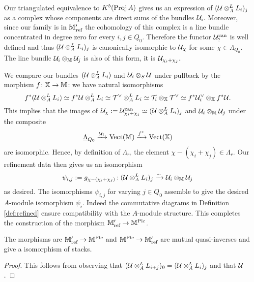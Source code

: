 \documentclass[12pt]{amsart}
\begin{document}
Our triangulated equivalence to $K^b(\operatorname{Proj} A)$ gives us an expression of $(\mathcal{U} \otimes_A^L L_i)_j$ as a complex whose components are direct sums of the bundles $\mathcal{U}_i$.
Moreover, since our family is in $\mathbb{M}_\text{ref}'$ the cohomology of this complex is a line bundle concentrated in degree zero for every $i,j \in Q_0$.
Therefore the functor $\mathcal{U}_?^\text{can}$ is well defined and thus $(\mathcal{U} \otimes_A^L L_i)_j$ is canonically isomorphic to $\mathcal{U}_{\chi}$ for some $\chi \in \Lambda_{Q_0}$.
The line bundle $\mathcal{U}_i \otimes_{\mathbb{M}} \mathcal{U}_j$ is also of this form, it is $\mathcal{U}_{\chi_i+\chi_j}$.

We compare our bundles $(\mathcal{U} \otimes_A^L L_i)$ and $\mathcal{U}_i \otimes_S \mathcal{U}$ under pullback by the morphism $f \colon \mathbb{X} \rightarrow \mathbb{M}$: we have natural isomorphisms
\begin{equation} \label{eq:natisolinebdls}
f^*(\mathcal{U} \otimes_A^L L_i) \simeq f^* \mathcal{U} \otimes_A^L L_i \simeq 
\mathcal{T}^{\vee} \otimes_A^L L_i \simeq \mathcal{T}_i \otimes_{\mathbb{X}} \mathcal{T}^{\vee} \simeq 
f^*\mathcal{U}_{i}^{\vee} \otimes_{\mathbb{X}} f^* \mathcal{U}.
\end{equation}
This implies that the images of $\mathcal{U}_\chi:= \mathcal{U}_{\chi_i + \chi_j}^\text{can} \simeq (\mathcal{U} \otimes_A^L L_i)_j$ and $\mathcal{U}_i \otimes_{\mathbb{M}} \mathcal{U}_j$ under the composite $$\underline{\Lambda}_{Q_0} \xrightarrow{\mathcal{U}_?} \operatorname{Vect}(\mathbb{M}) \xrightarrow{f^*} \operatorname{Vect}(\mathbb{X})$$ are isomorphic.
Hence, by definition of $\Lambda_r$, the element $\chi-(\chi_i+\chi_j) \in \Lambda_r$.
Our refinement data then gives us an isomorphism $$\psi_{i,j}:= g_{\chi-(\chi_i+\chi_j)} \colon (\mathcal{U} \otimes_A^L L_i)_j \xrightarrow{\sim} \mathcal{U}_i \otimes_{\mathbb{M}} \mathcal{U}_j$$ as desired.
The isomorphisms $\psi_{i,j}$ for varying $j \in Q_0$ assemble to give the desired $A$-module isomorphism $\psi_i$. 
Indeed the commutative diagrams in Definition \ref{def:refined} ensure compatibility with the $A$-module structure. 
This completes the construction of the morphism $\mathbb{M}'_{\text{ref}} \rightarrow \mathbb{M}^{\operatorname{Pic}}$.


\begin{theorem}
The morphisms are $\mathbb{M}'_{\textup{ref}} \rightarrow \mathbb{M}^{\operatorname{Pic}}$ and $\mathbb{M}^{\operatorname{Pic}} \rightarrow \mathbb{M}_\textup{ref}'$ are mutual quasi-inverses and give a isomorphism of stacks. 
\end{theorem}

\begin{proof}
This follows from observing that $(\mathcal{U} \otimes_A^L L_{i+j})_0 = (\mathcal{U} \otimes_A^L L_i)_j$ and that $\mathcal{U}$.
\end{proof}



\end{document}
